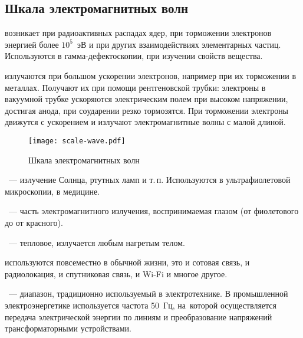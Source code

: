 \subsection{Шкала электромагнитных волн}

 возникает при радиоактивных распадах ядер, при торможении электронов энергией более $10^5$~эВ и при других взаимодействиях элементарных частиц. Используются в гамма-дефектоскопии, при изучении свойств вещества.

 излучаются при большом ускорении электронов, например при их торможении в металлах. Получают их при помощи рентгеновской трубки: электроны в вакуумной трубке ускоряются электрическим полем при высоком напряжении, достигая анода, при со­ударении резко тормозятся. При торможении электроны движут­ся с ускорением и излучают электромагнитные волны с малой длиной.

\begin{figure}[!h]
	\centering
	\texttt{[image: scale-wave.pdf]}
	\caption{Шкала электромагнитных волн}
\end{figure}
~--- излучение Солнца, ртутных ламп и т.\,п. Используются в ультрафиолетовой микроскопии, в медицине.

~--- часть электромагнитного излучения, воспринимаемая глазом (от фиолетового до от красного).

~--- тепловое, излучается любым нагретым телом.

 используются повсеместно в обычной жизни, это и сотовая связь, и радиолокация, и спутниковая связь, и Wi-Fi и многое другое.

~--- диапазон, традиционно используемый в электротехнике. В промышленной электроэнергетике используется частота 50~Гц, на~которой осуществляется передача электрической энергии по линиям и преобразование напряжений трансформаторными устройствами.
